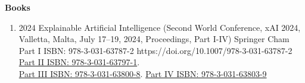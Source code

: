 \headedsection %
{\bf Books }{}
{
    \begin{enumerate}

        \item {}
                        {2024}
                        {Explainable Artificial Intelligence (Second World Conference, xAI 2024, Valletta, Malta, July 17–19, 2024, Proceedings, Part I-IV)}
                        {Springer}
                        {Cham}
                        {Part I ISBN: 978-3-031-63787-2}
                        {https://doi.org/10.1007/978-3-031-63787-2}
                        {\href{https://doi.org/10.1007/978-3-031-63797-1}{Part II ISBN: 978-3-031-63797-1}.\\
                         \href{https://doi.org/10.1007/978-3-031-63800-8}{Part III ISBN: 978-3-031-63800-8}.
                         \href{https://doi.org/10.1007/978-3-031-63803-9}{Part IV ISBN: 978-3-031-63803-9}}
    \end{enumerate}

}

